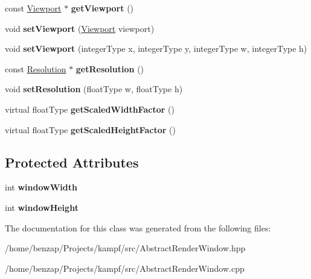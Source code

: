 \begin{DoxyCompactItemize}
\item 
\hypertarget{classAbstractRenderWindow_ad8208c399c06e065cf4ee3339c686c52}{const \hyperlink{structViewport}{Viewport} $\ast$ {\bfseries get\-Viewport} ()}\label{classAbstractRenderWindow_ad8208c399c06e065cf4ee3339c686c52}

\item 
\hypertarget{classAbstractRenderWindow_af13f1aa627e009a2a40a0cddc5d9c86c}{void {\bfseries set\-Viewport} (\hyperlink{structViewport}{Viewport} viewport)}\label{classAbstractRenderWindow_af13f1aa627e009a2a40a0cddc5d9c86c}

\item 
\hypertarget{classAbstractRenderWindow_a1b0b555e3130140a75340ac23cf0f81c}{void {\bfseries set\-Viewport} (integer\-Type x, integer\-Type y, integer\-Type w, integer\-Type h)}\label{classAbstractRenderWindow_a1b0b555e3130140a75340ac23cf0f81c}

\item 
\hypertarget{classAbstractRenderWindow_aacb3216ba30f916f7aab58cff0b9dfa4}{const \hyperlink{structResolution}{Resolution} $\ast$ {\bfseries get\-Resolution} ()}\label{classAbstractRenderWindow_aacb3216ba30f916f7aab58cff0b9dfa4}

\item 
\hypertarget{classAbstractRenderWindow_a56ce23ec7f5d015ffb0a419d7e9248b5}{void {\bfseries set\-Resolution} (float\-Type w, float\-Type h)}\label{classAbstractRenderWindow_a56ce23ec7f5d015ffb0a419d7e9248b5}

\item 
\hypertarget{classAbstractRenderWindow_aceaa73df5bc6ed5e046520a6e3d24ec3}{virtual float\-Type {\bfseries get\-Scaled\-Width\-Factor} ()}\label{classAbstractRenderWindow_aceaa73df5bc6ed5e046520a6e3d24ec3}

\item 
\hypertarget{classAbstractRenderWindow_a83fbb78386d30d6926eb44370e3c1396}{virtual float\-Type {\bfseries get\-Scaled\-Height\-Factor} ()}\label{classAbstractRenderWindow_a83fbb78386d30d6926eb44370e3c1396}

\end{DoxyCompactItemize}
\subsection*{Protected Attributes}
\begin{DoxyCompactItemize}
\item 
\hypertarget{classAbstractRenderWindow_aafc8a027534af592a6754a498dc4650d}{int {\bfseries window\-Width}}\label{classAbstractRenderWindow_aafc8a027534af592a6754a498dc4650d}

\item 
\hypertarget{classAbstractRenderWindow_a35262eea8d1786e83f306b59763cc024}{int {\bfseries window\-Height}}\label{classAbstractRenderWindow_a35262eea8d1786e83f306b59763cc024}

\end{DoxyCompactItemize}


The documentation for this class was generated from the following files\-:\begin{DoxyCompactItemize}
\item 
/home/benzap/\-Projects/kampf/src/Abstract\-Render\-Window.\-hpp\item 
/home/benzap/\-Projects/kampf/src/Abstract\-Render\-Window.\-cpp\end{DoxyCompactItemize}
